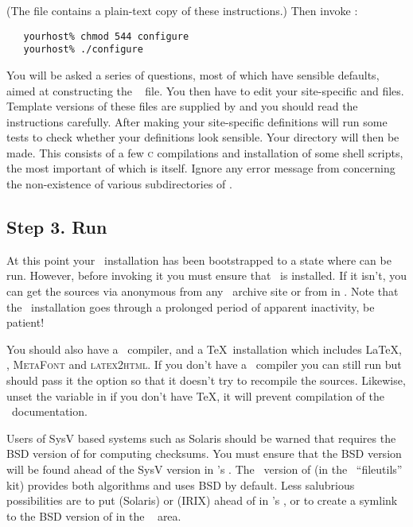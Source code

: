\noindent
(The  file contains a plain-text copy of these instructions.)
Then invoke :

\begin{verbatim}
   yourhost% chmod 544 configure
   yourhost% ./configure
\end{verbatim}

\noindent
You will be asked a series of questions, most of which have sensible defaults,
aimed at constructing the \aipspp\  file.  You then have to
edit your site-specific  and  files.  Template
versions of these files are supplied by  and you should read
the instructions carefully.  After making your site-specific definitions
 will run some tests to check whether your 
definitions look sensible.  Your  directory will then be made.
This consists of a few \textsc{c} compilations and installation of some shell
scripts, the most important of which is  itself.  Ignore any
error message from  concerning the non-existence of various
subdirectories of .

\subsection*{Step 3. Run }

At this point your \aipspp\ installation has been bootstrapped to a state
where  can be run.  However, before invoking it you must ensure
that \rcs\ is installed.  If it isn't, you can get the sources via anonymous
 from any \gnu\ archive site or from  in
.  Note that the \rcs\ installation goes through a prolonged
period of apparent inactivity, be patient!

You should also have a \cplusplus\ compiler, and a \TeX\ installation which
includes \LaTeX, , \textsc{MetaFont} and \textsc{latex2html}.
If you don't have a \cplusplus\ compiler you can still run  but
should pass it the  option so that it doesn't try to recompile the
sources.  Likewise, unset the  variable in  if you
don't have \TeX, it will prevent compilation of the \aipspp\ documentation.

Users of SysV based systems such as Solaris should be warned that
 requires the BSD version of  for computing
checksums.  You must ensure that the BSD version will be found ahead of the
SysV version in 's .  The \gnu\ version of
 (in the \gnu\ ``fileutils'' kit) provides both algorithms and
uses BSD by default.  Less salubrious possibilities are to put 
(Solaris) or  (IRIX) ahead of  in
's , or to create a symlink to the BSD version of
 in the \aipspp\  area.  


